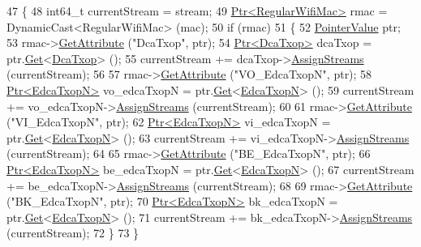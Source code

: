 \begin{DoxyCode}
47 \{
48   int64\_t currentStream = stream;
49   \hyperlink{classns3_1_1Ptr}{Ptr<RegularWifiMac>} rmac = DynamicCast<RegularWifiMac> (mac);
50   \textcolor{keywordflow}{if} (rmac)
51     \{
52       \hyperlink{classns3_1_1PointerValue}{PointerValue} ptr;
53       rmac->\hyperlink{classns3_1_1ObjectBase_a895d1de2f96063d0e0fd78463e7a7e30}{GetAttribute} (\textcolor{stringliteral}{"DcaTxop"}, ptr);
54       \hyperlink{classns3_1_1Ptr}{Ptr<DcaTxop>} dcaTxop = ptr.\hyperlink{classns3_1_1PointerValue_ae8e90fe3c0810cd6e4e1b1ba31f52a66}{Get}<\hyperlink{classns3_1_1DcaTxop}{DcaTxop}> ();
55       currentStream += dcaTxop->\hyperlink{classns3_1_1DcaTxop_a2a883932e6a255a5478c9594974dcdaa}{AssignStreams} (currentStream);
56 
57       rmac->\hyperlink{classns3_1_1ObjectBase_a895d1de2f96063d0e0fd78463e7a7e30}{GetAttribute} (\textcolor{stringliteral}{"VO\_EdcaTxopN"}, ptr);
58       \hyperlink{classns3_1_1Ptr}{Ptr<EdcaTxopN>} vo\_edcaTxopN = ptr.\hyperlink{classns3_1_1PointerValue_ae8e90fe3c0810cd6e4e1b1ba31f52a66}{Get}<\hyperlink{classns3_1_1EdcaTxopN}{EdcaTxopN}> ();
59       currentStream += vo\_edcaTxopN->\hyperlink{classns3_1_1DcaTxop_a2a883932e6a255a5478c9594974dcdaa}{AssignStreams} (currentStream);
60 
61       rmac->\hyperlink{classns3_1_1ObjectBase_a895d1de2f96063d0e0fd78463e7a7e30}{GetAttribute} (\textcolor{stringliteral}{"VI\_EdcaTxopN"}, ptr);
62       \hyperlink{classns3_1_1Ptr}{Ptr<EdcaTxopN>} vi\_edcaTxopN = ptr.\hyperlink{classns3_1_1PointerValue_ae8e90fe3c0810cd6e4e1b1ba31f52a66}{Get}<\hyperlink{classns3_1_1EdcaTxopN}{EdcaTxopN}> ();
63       currentStream += vi\_edcaTxopN->\hyperlink{classns3_1_1DcaTxop_a2a883932e6a255a5478c9594974dcdaa}{AssignStreams} (currentStream);
64 
65       rmac->\hyperlink{classns3_1_1ObjectBase_a895d1de2f96063d0e0fd78463e7a7e30}{GetAttribute} (\textcolor{stringliteral}{"BE\_EdcaTxopN"}, ptr);
66       \hyperlink{classns3_1_1Ptr}{Ptr<EdcaTxopN>} be\_edcaTxopN = ptr.\hyperlink{classns3_1_1PointerValue_ae8e90fe3c0810cd6e4e1b1ba31f52a66}{Get}<\hyperlink{classns3_1_1EdcaTxopN}{EdcaTxopN}> ();
67       currentStream += be\_edcaTxopN->\hyperlink{classns3_1_1DcaTxop_a2a883932e6a255a5478c9594974dcdaa}{AssignStreams} (currentStream);
68 
69       rmac->\hyperlink{classns3_1_1ObjectBase_a895d1de2f96063d0e0fd78463e7a7e30}{GetAttribute} (\textcolor{stringliteral}{"BK\_EdcaTxopN"}, ptr);
70       \hyperlink{classns3_1_1Ptr}{Ptr<EdcaTxopN>} bk\_edcaTxopN = ptr.\hyperlink{classns3_1_1PointerValue_ae8e90fe3c0810cd6e4e1b1ba31f52a66}{Get}<\hyperlink{classns3_1_1EdcaTxopN}{EdcaTxopN}> ();
71       currentStream += bk\_edcaTxopN->\hyperlink{classns3_1_1DcaTxop_a2a883932e6a255a5478c9594974dcdaa}{AssignStreams} (currentStream);
72     \}
73 \}
\end{DoxyCode}


